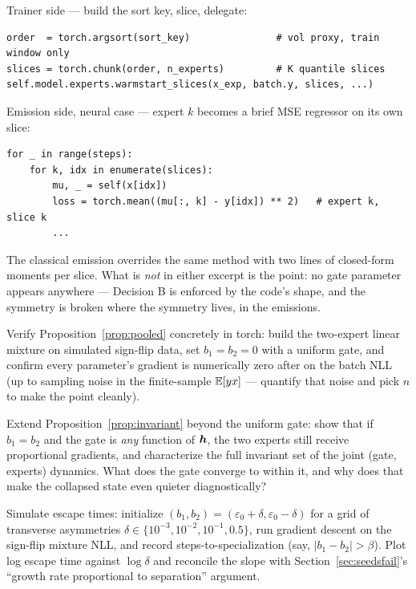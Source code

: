 \begin{codewalk}
Trainer side --- build the sort key, slice, delegate:
\begin{lstlisting}
order  = torch.argsort(sort_key)               # vol proxy, train window only
slices = torch.chunk(order, n_experts)         # K quantile slices
self.model.experts.warmstart_slices(x_exp, batch.y, slices, ...)
\end{lstlisting}
Emission side, neural case --- expert $k$ becomes a brief MSE regressor
on its own slice:
\begin{lstlisting}
for _ in range(steps):
    for k, idx in enumerate(slices):
        mu, _ = self(x[idx])
        loss = torch.mean((mu[:, k] - y[idx]) ** 2)   # expert k, slice k
        ...
\end{lstlisting}
The classical emission overrides the same method with two lines of
closed-form moments per slice. What is \emph{not} in either excerpt is
the point: no gate parameter appears anywhere --- Decision B is
enforced by the code's shape, and the symmetry is broken where the
symmetry lives, in the emissions.
\end{codewalk}

\exercisehead

\begin{exercise}\label{ex:8-stationary}
Verify Proposition~\ref{prop:pooled} concretely in torch: build the
two-expert linear mixture on simulated sign-flip data, set
$b_1 = b_2 = 0$ with a uniform gate, and confirm every parameter's
gradient is numerically zero after  on the batch NLL
(up to sampling noise in the finite-sample $\mathbb{E}[yx]$ --- quantify that
noise and pick $n$ to make the point cleanly).
\end{exercise}

\begin{exercise}\label{ex:8-invariant}
Extend Proposition~\ref{prop:invariant} beyond the uniform gate: show
that if $b_1 = b_2$ and the gate is \emph{any} function of $\bm{h}$, the
two experts still receive proportional gradients, and characterize the
full invariant set of the joint (gate, experts) dynamics. What does the
gate converge to within it, and why does that make the collapsed state
even quieter diagnostically?
\end{exercise}

\begin{exercise}\label{ex:8-escape}
Simulate escape times: initialize $(b_1, b_2) = (\varepsilon_0 + \delta,
\varepsilon_0 - \delta)$ for a grid of transverse asymmetries $\delta
\in \{10^{-3}, 10^{-2}, 10^{-1}, 0.5\}$, run gradient descent on the
sign-flip mixture NLL, and record steps-to-specialization (say,
$|b_1 - b_2| > \beta$). Plot log escape time against $\log\delta$ and
reconcile the slope with Section~\ref{sec:seedsfail}'s
``growth rate proportional to separation'' argument.
\end{exercise}

